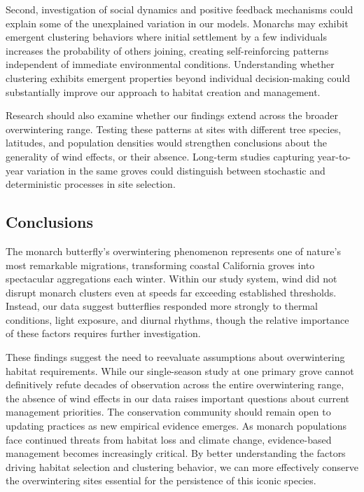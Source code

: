 Second, investigation of social dynamics and positive feedback mechanisms could explain some of the unexplained variation in our models. Monarchs may exhibit emergent clustering behaviors where initial settlement by a few individuals increases the probability of others joining, creating self-reinforcing patterns independent of immediate environmental conditions. Understanding whether clustering exhibits emergent properties beyond individual decision-making could substantially improve our approach to habitat creation and management.

Research should also examine whether our findings extend across the broader overwintering range. Testing these patterns at sites with different tree species, latitudes, and population densities would strengthen conclusions about the generality of wind effects, or their absence. Long-term studies capturing year-to-year variation in the same groves could distinguish between stochastic and deterministic processes in site selection.

\subsection{Conclusions}

The monarch butterfly's overwintering phenomenon represents one of nature's most remarkable migrations, transforming coastal California groves into spectacular aggregations each winter. Within our study system, wind did not disrupt monarch clusters even at speeds far exceeding established thresholds. Instead, our data suggest butterflies responded more strongly to thermal conditions, light exposure, and diurnal rhythms, though the relative importance of these factors requires further investigation.

These findings suggest the need to reevaluate assumptions about overwintering habitat requirements. While our single-season study at one primary grove cannot definitively refute decades of observation across the entire overwintering range, the absence of wind effects in our data raises important questions about current management priorities. The conservation community should remain open to updating practices as new empirical evidence emerges. As monarch populations face continued threats from habitat loss and climate change, evidence-based management becomes increasingly critical. By better understanding the factors driving habitat selection and clustering behavior, we can more effectively conserve the overwintering sites essential for the persistence of this iconic species.